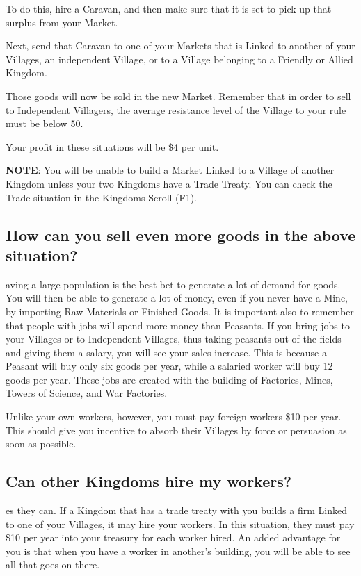 To do this, hire a Caravan, and then make sure that it is set to pick up that surplus from your Market.


Next, send that Caravan to one of your Markets that is Linked to another of your Villages, an independent Village, or to a Village belonging to a Friendly or Allied Kingdom.

Those goods will now be sold in the new Market. Remember that in order to sell to Independent Villagers, the average resistance level of the Village to your rule must be below 50.

Your profit in these situations will be \$4 per unit.

\textbf{NOTE}: You will be unable to build a Market Linked to a Village of another Kingdom unless your two Kingdoms have a Trade Treaty. You can check the Trade situation in the Kingdoms Scroll (F1).

\subsection{\textsf{How can you sell even more goods in the above situation?}}

aving a large population is the best bet to generate a lot of demand for goods. You will then be able to generate a lot of money, even if you never have a Mine, by importing Raw Materials or Finished Goods. It is important also to remember that people with jobs will spend more money than Peasants. If you bring jobs to your Villages or to Independent Villages, thus taking peasants out of the fields and giving them a salary, you will see your sales increase. This is because a Peasant will buy only six goods per year, while a salaried worker will buy 12 goods per year. These jobs are created with the building of Factories, Mines, Towers of Science, and War Factories.

Unlike your own workers, however, you must pay foreign workers \$10 per year. This should give you incentive to absorb their Villages by force or persuasion as soon as possible.

\subsection{\textsf{Can other Kingdoms hire my workers?}}

es they can. If a Kingdom that has a trade treaty with you builds a firm Linked to one of your Villages, it may hire your workers. In this situation, they must pay \$10 per year into your treasury for each worker hired. An added advantage for you is that when you have a worker in another’s building, you will be able to see all that goes on there.